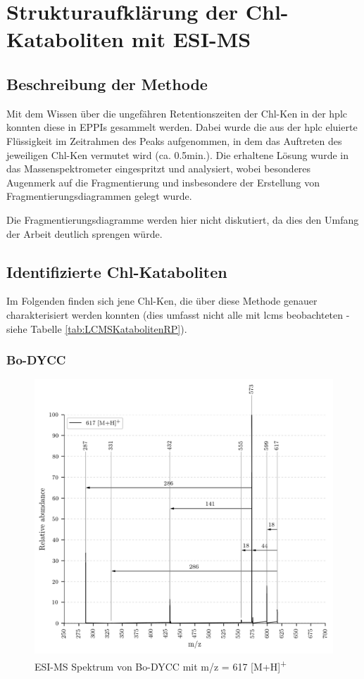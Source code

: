 \chapter{Strukturaufklärung der Chl-Kataboliten mit ESI-MS} \label{sec:ChlKatabolitenESIMS}

\section{Beschreibung der Methode}

Mit dem Wissen über die ungefähren Retentionszeiten der \gls{Chl-K}en in der \gls{hplc} konnten diese in EPPIs gesammelt werden. Dabei wurde die aus der \gls{hplc} eluierte Flüssigkeit im Zeitrahmen des Peaks aufgenommen, in dem das Auftreten des jeweiligen \gls{Chl-K}en vermutet wird (ca. 0.5min.). Die erhaltene Lösung wurde in das Massenspektrometer eingespritzt und analysiert, wobei besonderes Augenmerk auf die Fragmentierung und insbesondere der Erstellung von Fragmentierungsdiagrammen gelegt wurde. 

Die Fragmentierungsdiagramme werden hier nicht diskutiert, da dies den Umfang der Arbeit deutlich sprengen würde. 

\section{Identifizierte Chl-Kataboliten}

Im Folgenden finden sich jene \gls{Chl-K}en, die über diese Methode genauer charakterisiert werden konnten (dies umfasst nicht alle mit \gls{lcms} beobachteten - siehe Tabelle \ref{tab:LCMSKatabolitenRP}). 

\subsection{Bo-DYCC}

\begin{figure}[!htbp]
  \centering
  \includegraphics[width=\textwidth, height=0.6\textwidth]{figures/Kapitel7/Kataboliten/VWA_MS_617.png}
  \caption[ESI-MS Spektrum von Bo-DYCC, Quelle: Autor]{ESI-MS Spektrum von Bo-DYCC mit m/z = 617 [M+H]\textsuperscript{+}}
  \label{fig:617MH}
\end{figure}

